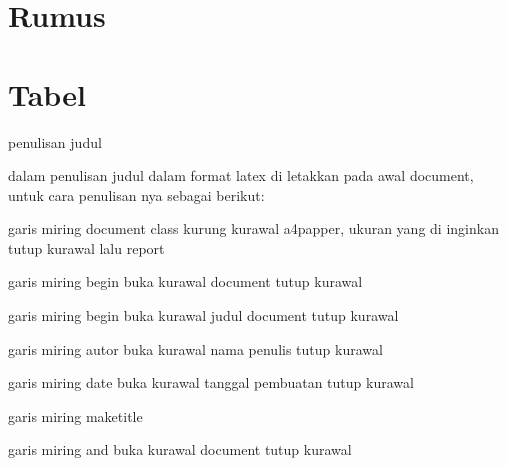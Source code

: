 \section{Rumus}

\section{Tabel}


penulisan judul

dalam penulisan judul dalam format latex di letakkan pada awal document, untuk cara penulisan nya sebagai berikut:

garis miring document class kurung kurawal a4papper, ukuran yang di inginkan tutup kurawal lalu report

garis miring begin buka kurawal document tutup kurawal

garis miring begin buka kurawal judul document tutup kurawal

garis miring autor buka kurawal nama penulis tutup kurawal 

garis miring date buka kurawal tanggal pembuatan tutup kurawal
 
garis miring maketitle

garis miring and buka kurawal document tutup kurawal 